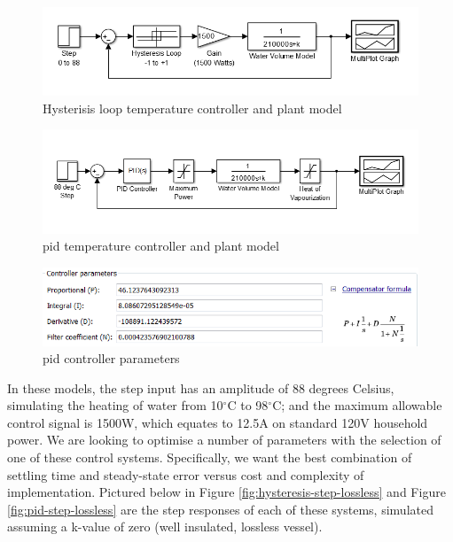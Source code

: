 \documentclass{article}
\begin{document}
\begin{figure}[H]
\begin{center}
\includegraphics[scale=0.50]{hysteresis-block-diagram.png}
\caption{Hysterisis loop temperature controller and plant model}
\label{fig:hysteresis-block-diagram}
\end{center}
\end{figure}

\begin{figure}[H]
\begin{center}
\includegraphics[scale=0.50]{pid-block-diagram.png}
\caption{\gls{pid} temperature controller and plant model}
\label{fig:pid-block-diagram}
\end{center}
\end{figure}

\begin{figure}[H]
\begin{center}
\includegraphics[scale=0.50]{pid-parameters.png}
\caption{\gls{pid} controller parameters}
\label{fig:pid-parameters}
\end{center}
\end{figure}

In these models, the step input has an amplitude of 88 degrees Celsius, simulating the heating of water from 10$^{\circ}$C to 98$^{\circ}$C; and the maximum allowable control signal is 1500W, which equates to 12.5A on standard 120V household power. We are looking to optimise a number of parameters with the selection of one of these control systems. Specifically, we want the best combination of settling time and steady-state error versus cost and complexity of implementation. Pictured below in Figure \ref{fig:hysteresis-step-lossless} and Figure \ref{fig:pid-step-lossless} are the step responses of each of these systems, simulated assuming a k-value of zero (well insulated, lossless vessel).
\end{document}
